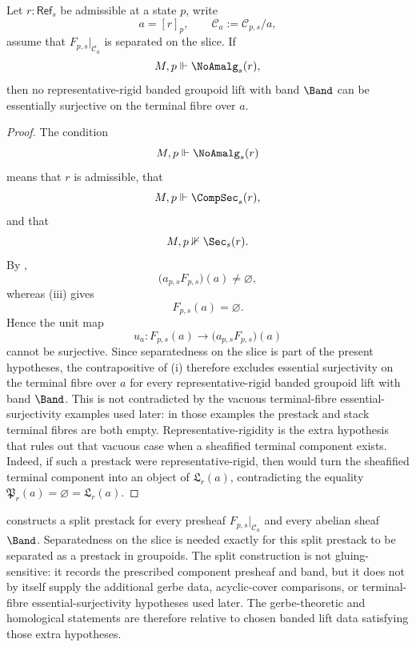 \begin{corollary}\label{cor:no-rigid-gluing-null}
Let $r:\mathsf{Ref}_s$ be admissible at a state $p$, write
\[
a=[r]_p,
\qquad
\mathcal C_a:=\mathcal C_{p,s}/a,
\]
assume that $F_{p,s}|_{\mathcal C_a}$ is separated on the slice. If
\[
M,p\Vdash \NoAmalg_s(r),
\]
then no representative-rigid banded groupoid lift with band $\Band$ can be essentially surjective on the terminal fibre over $a$.
\end{corollary}

\begin{proof}
The condition
\[
M,p\Vdash \NoAmalg_s(r)
\]
means that $r$ is admissible, that
\[
M,p\Vdash \CompSec_s(r),
\]
and that
\[
M,p\nVdash \Sec_s(r).
\]
By ,
\[
\bigl(a_{p,s}F_{p,s}\bigr)(a)\neq\varnothing,
\]
whereas (iii) gives
\[
F_{p,s}(a)=\varnothing.
\]
Hence the unit map
\[
u_a:F_{p,s}(a)\to \bigl(a_{p,s}F_{p,s}\bigr)(a)
\]
cannot be surjective. Since separatedness on the slice is part of the present
hypotheses, the contrapositive of
(i) therefore excludes essential
surjectivity on the terminal fibre over $a$ for every representative-rigid banded groupoid lift
with band $\Band$.
This is not contradicted by the vacuous terminal-fibre essential-surjectivity examples used
later: in those examples the prestack and stack terminal fibres are both
empty. Representative-rigidity is the extra hypothesis that rules out that
vacuous case when a sheafified terminal component exists. Indeed, if such a
prestack were representative-rigid, then
 would turn the sheafified terminal
component into an object of $\mathfrak L_r(a)$, contradicting the equality
$\mathfrak P_r(a)=\varnothing=\mathfrak L_r(a)$.
\end{proof}

\begin{remark}\label{rem:gluing-sensitive-lifts}
 constructs a split prestack for every
presheaf \(F_{p,s}|_{\mathcal C_a}\) and every abelian sheaf \(\Band\).
Separatedness on the slice is needed exactly for this split prestack to be
separated as a prestack in groupoids. The split construction is not
gluing-sensitive: it records the prescribed component presheaf and band, but
it does not by itself supply the additional gerbe data, acyclic-cover
comparisons, or terminal-fibre essential-surjectivity hypotheses used later. The
gerbe-theoretic and homological statements are therefore relative to chosen
banded lift data satisfying those extra hypotheses.
\end{remark}
